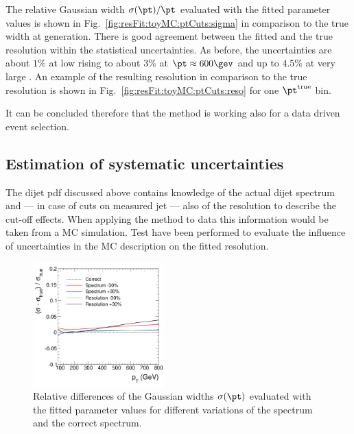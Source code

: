 \documentclass[a4paper]{cmspaper} %
\newcommand{\truth}{\ensuremath{\pt^{\text{true}}}\xspace}
\begin{document}
The relative Gaussian width $\sigma(\pt)/\pt$ evaluated with the fitted
parameter values is shown in Fig.~\ref{fig:resFit:toyMC:ptCuts:sigma}
in comparison to the true width at generation.
There is good agreement between the fitted and the true resolution
within the statistical uncertainties.
As before, the uncertainties are about $1\%$ at low \pt rising to
about $3\%$ at $\pt \approx 600\gev$ and up to $4.5\%$ at very large
\pt.
An example of the resulting resolution in comparison to the true
resolution is shown in Fig.~\ref{fig:resFit:toyMC:ptCuts:reso} for
one \truth bin.

It can be concluded therefore that the method is working also for a data driven event selection.



\subsection{Estimation of systematic uncertainties}\label{sec:resFit:toyMC:uncert}

The dijet pdf discussed above contains knowledge of the actual dijet spectrum and --- in case of cuts on measured jet \pt --- also of the resolution to describe the cut-off effects.
When applying the method to data this information would be taken from a MC simulation.
Test have been performed to evaluate the influence of uncertainties in the MC description on the fitted resolution.

\begin{figure}[ht]
  \centering
  \includegraphics[width=0.45\textwidth]{figures/resFit_ToyMC_PtCuts_SigmaUncertainties}
  \caption{Relative differences of the Gaussian widths $\sigma(\pt)$ evaluated with the fitted
    parameter values for different variations of the spectrum and the correct spectrum.}
  \label{fig:resFit:toyMC:uncert:systUncertainties}
\end{figure}
\end{document}

